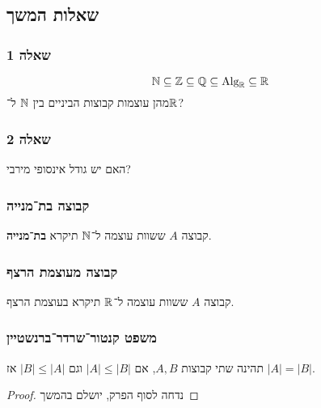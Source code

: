 \subsection{שאלות המשך}
\subsubsection{שאלה 1}
\[
	\mathbb{N} \subseteq \mathbb{Z} \subseteq \mathbb{Q} \subseteq \text{Alg}_{\mathbb{R}} \subseteq \mathbb{R}
\]
מהן עוצמות קבוצות הביניים בין $\mathbb{N}$ ל־$\mathbb{R}$?

\subsubsection{שאלה 2}
האם יש גודל אינסופי מירבי?

\subsubsection{קבוצה בת־מנייה}
קבוצה $A$ ששוות עוצמה ל־$\mathbb{N}$ תיקרא \textbf{בת־מנייה}.

\subsubsection{קבוצה מעוצמת הרצף}
קבוצה $A$ ששוות עוצמה ל־$\mathbb{R}$ תיקרא בעוצמת הרצף.

\subsubsection{משפט קנטור־שרדר־ברנשטיין}
תהינה שתי קבוצות $A, B$, אם $|A| \le |B|$ וגם $|B| \le |A|$ אז $|A| = |B|$.
\begin{proof}
	נדחה לסוף הפרק, יושלם בהמשך
\end{proof}

